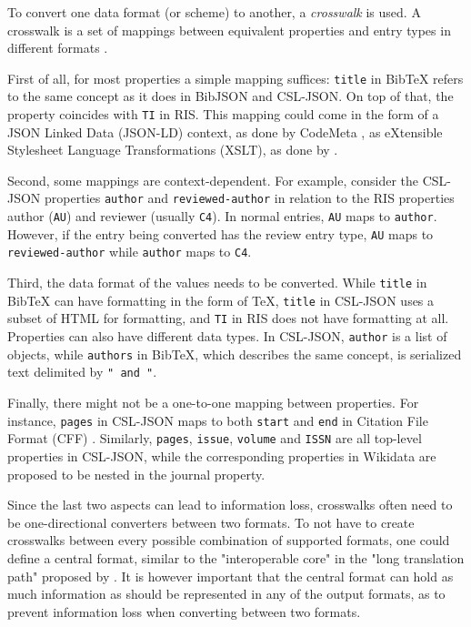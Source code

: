 \documentclass[fleqn,10pt,lineno]{wlpeerj} %
\begin{document}
To convert one data format (or scheme) to another, a \emph{crosswalk} is used. A crosswalk is a set of mappings between equivalent properties and entry types in different formats \citep{pierre_issues_1998}.

First of all, for most properties a simple mapping suffices: \texttt{title} in BibTeX refers to the same concept as it does in BibJSON and CSL-JSON. On top of that, the property coincides with \texttt{TI} in RIS. This mapping could come in the form of a JSON Linked Data (JSON-LD) context, as done by CodeMeta \citep{jones_codemeta:_2017}, as eXtensible Stylesheet Language Transformations (XSLT), as done by \cite{godby_two_2003}.

Second, some mappings are context-dependent. For example, consider the CSL-JSON properties \texttt{author} and \texttt{reviewed-author} in relation to the RIS properties author (\texttt{AU}) and reviewer (usually \texttt{C4}). In normal entries, \texttt{AU} maps to \texttt{author}. However, if the entry being converted has the review entry type, \texttt{AU} maps to \texttt{reviewed-author} while \texttt{author} maps to \texttt{C4}.

Third, the data format of the values needs to be converted. While \texttt{title} in BibTeX can have formatting in the form of \TeX, \texttt{title} in CSL-JSON uses a subset of HTML for formatting, and \texttt{TI} in RIS does not have formatting at all. Properties can also have different data types. In CSL-JSON, \texttt{author} is a list of objects, while \texttt{authors} in BibTeX, which describes the same concept, is serialized text delimited by \texttt{" and "}.

Finally, there might not be a one-to-one mapping between properties. For instance, \texttt{pages} in CSL-JSON maps to both \texttt{start} and \texttt{end} in Citation File Format (CFF) \citep{druskat_citation_2018}. Similarly, \texttt{pages}, \texttt{issue}, \texttt{volume} and \texttt{ISSN} are all top-level properties in CSL-JSON, while the corresponding properties in Wikidata are proposed to be nested in the journal property.

Since the last two aspects can lead to information loss, crosswalks often need to be one-directional converters between two formats. To not have to create crosswalks between every possible combination of supported formats, one could define a central format, similar to the "interoperable core" in the "long translation path" proposed by \cite{godby_two_2003}. It is however important that the central format can hold as much information as should be represented in any of the output formats, as to prevent information loss when converting between two formats.
\end{document}
